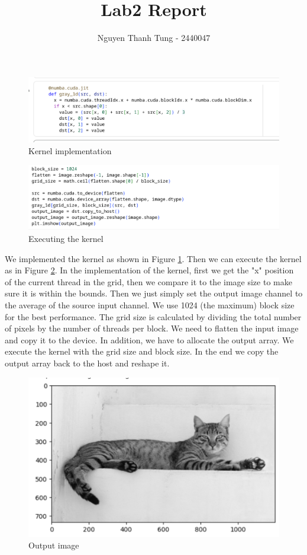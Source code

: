 \documentclass{article}
\title{Lab2 Report}
\author{Nguyen Thanh Tung - 2440047}
\begin{document}
\maketitle


\begin{figure}[h!]
    \centering
    \includegraphics[width=1\linewidth]{impl.png}
    \caption{Kernel implementation}
    \label{fig:kernel}
\end{figure}

\begin{figure}[h!]
    \centering
    \includegraphics[width=1\linewidth]{run.png}
    \caption{Executing the kernel}
    \label{fig:exec}
\end{figure}


We implemented the kernel as shown in Figure \ref{fig:kernel}. Then we can execute the kernel as in Figure \ref{fig:exec}. In the implementation of the kernel, first we get the "x" position of the current thread in the grid, then we compare it to the image size to make sure it is within the bounds. Then we just simply set the output image channel to the average of the source input channel. We use 1024 (the maximum) block size for the best performance. The grid size is calculated by dividing the total number of pixels by the number of threads per block. We need to flatten the input image and copy it to the device. In addition, we have to allocate the output array. We execute the kernel with the grid size and block size. In the end we copy the output array back to the host and reshape it.


\begin{figure}[h!]
    \centering
    \includegraphics[width=0.5\linewidth]{output.png}
    \caption{Output image}
    \label{fig:placeholder}
\end{figure}
\end{document}
